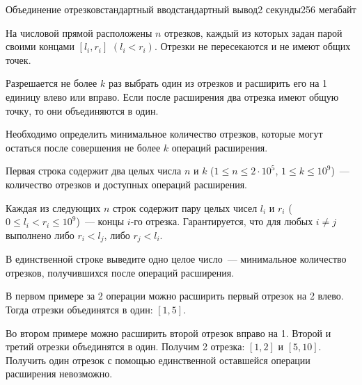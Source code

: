 \begin{problem}{Объединение отрезков}{стандартный ввод}{стандартный вывод}{2 секунды}{256 мегабайт}

На числовой прямой расположены $n$ отрезков, каждый из которых задан парой своими концами $[l_i, r_i]$ $(l_i < r_i)$. Отрезки не пересекаются и не имеют общих точек.

Разрешается не более $k$ раз выбрать один из отрезков и расширить его на 1 единицу влево или вправо. Если после расширения два отрезка имеют общую точку, то они объединяются в один.

Необходимо определить минимальное количество отрезков, которые могут остаться после совершения не более $k$ операций расширения.

\InputFile
Первая строка содержит два целых числа $n$ и $k$ ($1 \leq n \leq 2\cdot 10^5$, $1 \leq k \leq 10^9$)~--- количество отрезков и доступных операций расширения.

Каждая из следующих $n$ строк содержит пару целых чисел $l_i$ и $r_i$ ($0 \leq l_i < r_i \leq 10^9$)~--- концы $i$-го отрезка. Гарантируется, что для любых $i \neq j$ выполнено либо $r_i < l_j$, либо $r_j < l_i$.

\OutputFile
В единственной строке выведите одно целое число~--- минимальное количество отрезков, получившихся после операций расширения.

\Examples

\begin{example}
%
%
\end{example}

\Note
В первом примере за 2 операции можно расширить первый отрезок на 2 влево. Тогда отрезки объединятся в один: $[1,5]$.

Во втором примере можно расширить второй отрезок вправо на 1. Второй и третий отрезки объединятся в один. Получим 2 отрезка: $[1,2]$ и $[5,10]$. Получить один отрезок с помощью единственной оставшейся операции расширения невозможно.

\end{problem}

